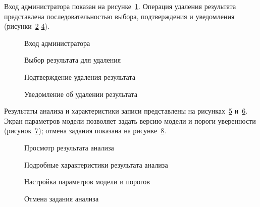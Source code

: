 Вход администратора показан на рисунке~\ref{fig:proto8}. Операция удаления
результата представлена последовательностью выбора, подтверждения и уведомления
(рисунки~\ref{fig:proto9}-\ref{fig:proto11}).
\begin{figure}[H]\centering
 \caption{Вход администратора}\label{fig:proto8}
\end{figure}
\begin{figure}[H]\centering
 \caption{Выбор результата для удаления}\label{fig:proto9}
\end{figure}
\begin{figure}[H]\centering
 \caption{Подтверждение удаления результата}\label{fig:proto10}
\end{figure}
\begin{figure}[H]\centering
 \caption{Уведомление об удалении результата}\label{fig:proto11}
\end{figure}

Результаты анализа и характеристики записи представлены на
рисунках~\ref{fig:proto12} и~\ref{fig:proto13}. Экран параметров модели
позволяет задать версию модели и пороги уверенности (рисунок~\ref{fig:proto14});
отмена задания показана на рисунке~\ref{fig:proto15}.
\begin{figure}[H]\centering
 \caption{Просмотр результата анализа}\label{fig:proto12}
\end{figure}
\begin{figure}[H]\centering
 \caption{Подробные характеристики результата анализа}\label{fig:proto13}
\end{figure}
\begin{figure}[H]\centering
 \caption{Настройка параметров модели и порогов}\label{fig:proto14}
\end{figure}
\begin{figure}[H]\centering
 \caption{Отмена задания анализа}\label{fig:proto15}
\end{figure}
